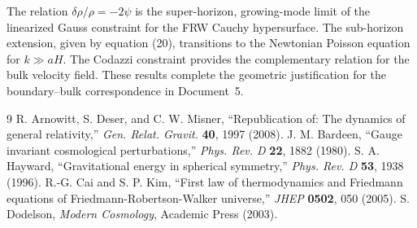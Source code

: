 \documentclass[12pt,a4paper]{article}
\begin{document}
The relation $\delta\rho/\rho = -2\psi$ is the super-horizon, growing-mode limit of the linearized Gauss constraint for the FRW Cauchy hypersurface. The sub-horizon extension, given by equation (20), transitions to the Newtonian Poisson equation for $k \gg aH$. The Codazzi constraint provides the complementary relation for the bulk velocity field. These results complete the geometric justification for the boundary--bulk correspondence in Document~5.

\begin{thebibliography}{9}
 R. Arnowitt, S. Deser, and C. W. Misner, ``Republication of: The dynamics of general relativity,'' \textit{Gen. Relat. Gravit.} \textbf{40}, 1997 (2008).
 J. M. Bardeen, ``Gauge invariant cosmological perturbations,'' \textit{Phys. Rev. D} \textbf{22}, 1882 (1980).
 S. A. Hayward, ``Gravitational energy in spherical symmetry,'' \textit{Phys. Rev. D} \textbf{53}, 1938 (1996).
 R.-G. Cai and S. P. Kim, ``First law of thermodynamics and Friedmann equations of Friedmann-Robertson-Walker universe,'' \textit{JHEP} \textbf{0502}, 050 (2005).
 S. Dodelson, \textit{Modern Cosmology}, Academic Press (2003).
\end{thebibliography}
\end{document}
